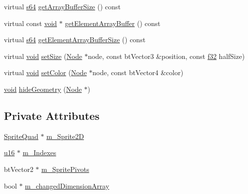 \begin{DoxyCompactItemize}
\item 
virtual \mbox{\hyperlink{_util_8h_a4258bfb2c3a440d06c4aaa3c2b450dde}{s64}} \mbox{\hyperlink{classnjli_1_1_sprite2_d_a7ce47c8c15d233418ebc5f012291a2d9}{get\+Array\+Buffer\+Size}} () const
\item 
virtual const \mbox{\hyperlink{_thread_8h_af1e856da2e658414cb2456cb6f7ebc66}{void}} $\ast$ \mbox{\hyperlink{classnjli_1_1_sprite2_d_a87994e01a64d5c6c72c98434f7147a08}{get\+Element\+Array\+Buffer}} () const
\item 
virtual \mbox{\hyperlink{_util_8h_a4258bfb2c3a440d06c4aaa3c2b450dde}{s64}} \mbox{\hyperlink{classnjli_1_1_sprite2_d_a214b06be63b407db77a24bd639b39b60}{get\+Element\+Array\+Buffer\+Size}} () const
\item 
virtual \mbox{\hyperlink{_thread_8h_af1e856da2e658414cb2456cb6f7ebc66}{void}} \mbox{\hyperlink{classnjli_1_1_sprite2_d_a318f37bf46314d96ce9c70794cf6125a}{set\+Size}} (\mbox{\hyperlink{classnjli_1_1_node}{Node}} $\ast$node, const bt\+Vector3 \&position, const \mbox{\hyperlink{_util_8h_a5f6906312a689f27d70e9d086649d3fd}{f32}} half\+Size)
\item 
virtual \mbox{\hyperlink{_thread_8h_af1e856da2e658414cb2456cb6f7ebc66}{void}} \mbox{\hyperlink{classnjli_1_1_sprite2_d_a5b32ecafaa923c27662db4ae37286815}{set\+Color}} (\mbox{\hyperlink{classnjli_1_1_node}{Node}} $\ast$node, const bt\+Vector4 \&color)
\item 
\mbox{\hyperlink{_thread_8h_af1e856da2e658414cb2456cb6f7ebc66}{void}} \mbox{\hyperlink{classnjli_1_1_sprite2_d_a4a0be33f855fcef2b8ab1ebed8b09652}{hide\+Geometry}} (\mbox{\hyperlink{classnjli_1_1_node}{Node}} $\ast$)
\end{DoxyCompactItemize}
\subsection*{Private Attributes}
\begin{DoxyCompactItemize}
\item 
\mbox{\hyperlink{classnjli_1_1_sprite2_d_1_1_sprite_quad}{Sprite\+Quad}} $\ast$ \mbox{\hyperlink{classnjli_1_1_sprite2_d_a0fad1694353e933dcd9793b071ff126b}{m\+\_\+\+Sprite2D}}
\item 
\mbox{\hyperlink{_util_8h_a9e6c91d77e24643b888dbd1a1a590054}{u16}} $\ast$ \mbox{\hyperlink{classnjli_1_1_sprite2_d_ad95a14aca71071fb7bca74a1320cd5f3}{m\+\_\+\+Indexes}}
\item 
bt\+Vector2 $\ast$ \mbox{\hyperlink{classnjli_1_1_sprite2_d_a11de2ec387edcd23e7b0508e00e4266b}{m\+\_\+\+Sprite\+Pivots}}
\item 
bool $\ast$ \mbox{\hyperlink{classnjli_1_1_sprite2_d_ad79c244e39d2c124fc790b15474035e0}{m\+\_\+changed\+Dimension\+Array}}
\end{DoxyCompactItemize}
